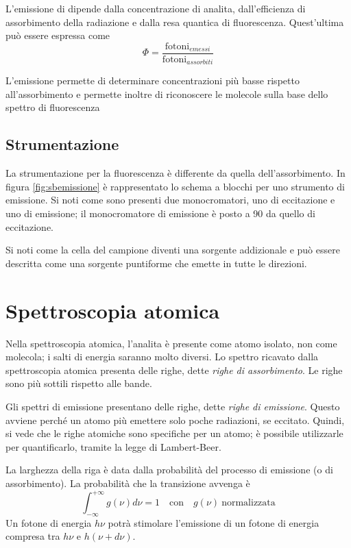 L'emissione di dipende dalla concentrazione di analita, dall'efficienza di assorbimento della radiazione e dalla resa quantica di fluorescenza.
Quest'ultima può essere espressa come
\[
\Phi = \frac{\text{fotoni}_{emessi}}{\text{fotoni}_{assorbiti}}
\]

L'emissione permette di determinare concentrazioni più basse rispetto all'assorbimento e permette inoltre di riconoscere le molecole sulla base dello spettro di fluorescenza


\subsection{Strumentazione}
La strumentazione per la fluorescenza è differente da quella dell'assorbimento. In figura \ref{fig:sbemissione} è rappresentato lo schema a blocchi per uno strumento di emissione.
Si noti come sono presenti due monocromatori, uno di eccitazione e uno di emissione; il monocromatore di emissione è posto a 90 \degree da quello di eccitazione.


Si noti come la cella del campione diventi una sorgente addizionale e può essere descritta come una sorgente puntiforme che emette in tutte le direzioni.

\section{Spettroscopia atomica}
Nella spettroscopia atomica, l'analita è presente come atomo isolato, non come molecola; i salti di energia saranno molto diversi.
Lo spettro ricavato dalla spettroscopia atomica presenta delle righe, dette \emph{righe di assorbimento}. Le righe sono più sottili rispetto alle bande.


Gli spettri di emissione presentano delle righe, dette \emph{righe di emissione}. Questo avviene perché un atomo più emettere solo poche radiazioni, se eccitato.
Quindi, si vede che le righe atomiche sono specifiche per un atomo; è possibile utilizzarle per quantificarlo, tramite la legge di Lambert-Beer.

La larghezza della riga è data dalla probabilità del processo di emissione (o di assorbimento).
La probabilità che la transizione avvenga è
\[
\int_{-\infty}^{+\infty} g(\nu) d\nu = 1 \quad \text{con} \quad g(\nu) \: \text{normalizzata}
\]
Un fotone di energia $h \nu$ potrà stimolare l'emissione di un fotone di energia compresa tra $h \nu$ e $h (\nu + d\nu)$.

